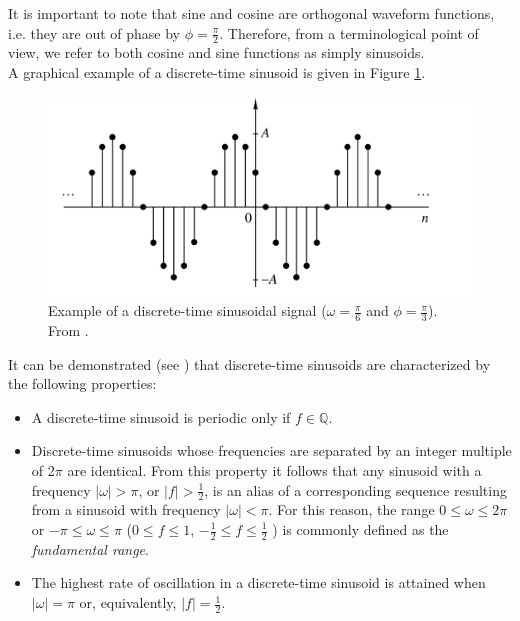 \noindent It is important to note that sine and cosine are orthogonal waveform functions, i.e. they are out of phase by $\phi = \frac{\pi}{2}$. Therefore, from a terminological point of view, we refer to both cosine and sine functions as simply sinusoids. \\
A graphical example of a discrete-time sinusoid is given in Figure \ref{fig:sinusoidal_signal}.

\begin{figure}[H]
	\begin{center}
		\includegraphics[scale=0.4]{img/sinusoidal_signal.png}
		\captionsetup{margin=2cm}
		\caption{Example of a discrete-time sinusoidal signal ($\omega = \frac{\pi}{6}$ and $\phi = \frac{\pi}{3}$). From \cite{proakis2006dimitris}.} 
		\label{fig:sinusoidal_signal}
	\end{center}
\end{figure}

\noindent It can be demonstrated  (see \cite{proakis2006dimitris}) that discrete-time sinusoids are characterized by the following properties:
\begin{itemize}
	\item A discrete-time sinusoid is periodic only if $f\in \mathbb{Q}$.
	\item Discrete-time sinusoids whose frequencies are separated by an integer multiple of 2$\pi$ are identical. From this property it follows that any sinusoid with a frequency $|\omega| > \pi$, or $|f| > \frac{1}{2}$, is an alias of a corresponding sequence resulting from a sinusoid with frequency $|\omega| < \pi$. For this reason, the range $0 \leq \omega \leq 2\pi$ or $-\pi \leq \omega \leq \pi$  ($0 \leq f \leq 1$, $-\frac{1}{2} \leq f \leq \frac{1}{2}$ ) is commonly defined as the \textit{fundamental range}.
	\item The highest rate of oscillation in a discrete-time sinusoid is attained when $|\omega| = \pi$ or, equivalently, $|f| = \frac{1}{2}$.
\end{itemize}

